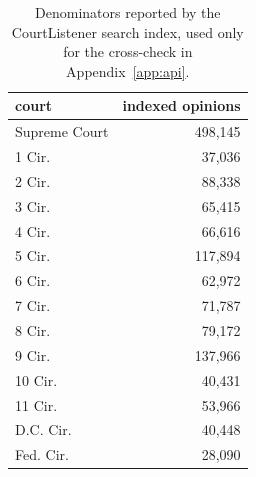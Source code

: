 \begin{table}[t]
\centering\small
\begin{tabular}{lr}
\toprule
court & indexed opinions \\
\midrule
Supreme Court & 498,145 \\
1 Cir. & 37,036 \\
2 Cir. & 88,338 \\
3 Cir. & 65,415 \\
4 Cir. & 66,616 \\
5 Cir. & 117,894 \\
6 Cir. & 62,972 \\
7 Cir. & 71,787 \\
8 Cir. & 79,172 \\
9 Cir. & 137,966 \\
10 Cir. & 40,431 \\
11 Cir. & 53,966 \\
D.C. Cir. & 40,448 \\
Fed. Cir. & 28,090 \\
\bottomrule
\end{tabular}
\caption{Denominators reported by the CourtListener search index, used only for the cross-check in Appendix~\ref{app:api}.}
\label{tab:api}
\end{table}
